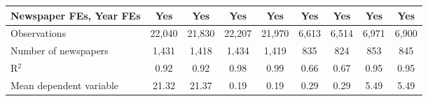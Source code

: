 {\begin{tabular}{l*{8}{c}}
\addlinespace
Newspaper FEs, Year FEs &         Yes         &         Yes         &         Yes         &         Yes         &         Yes         &         Yes         &         Yes         &         Yes         \\
\midrule
Observations        &      22,040         &      21,830         &      22,207         &      21,970         &       6,613         &       6,514         &       6,971         &       6,900         \\
Number of newspapers&       1,431         &       1,418         &       1,434         &       1,419         &         835         &         824         &         853         &         845         \\
R$^2$               &        0.92         &        0.92         &        0.98         &        0.99         &        0.66         &        0.67         &        0.95         &        0.95         \\
Mean dependent variable&       21.32         &       21.37         &        0.19         &        0.19         &        0.29         &        0.29         &        5.49         &        5.49         \\
\bottomrule
\end{tabular}
}
